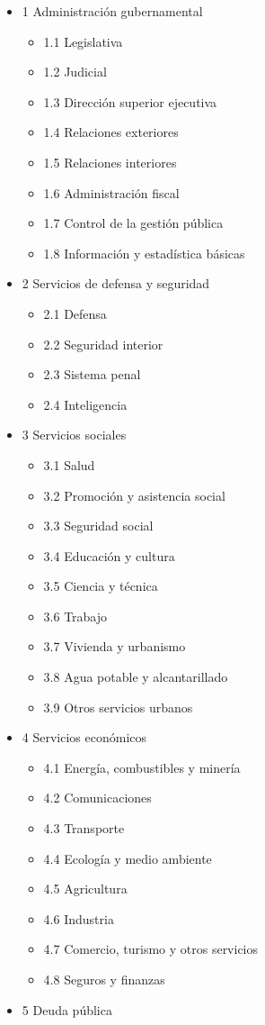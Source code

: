\documentclass[
  12,
]{article}
\providecommand{\tightlist}{%
  \setlength{\itemsep}{0pt}\setlength{\parskip}{0pt}}
\begin{document}
\begin{itemize}
\tightlist
\item
  1 Administración gubernamental

  \begin{itemize}
  \tightlist
  \item
    1.1 Legislativa
  \item
    1.2 Judicial
  \item
    1.3 Dirección superior ejecutiva
  \item
    1.4 Relaciones exteriores
  \item
    1.5 Relaciones interiores
  \item
    1.6 Administración fiscal
  \item
    1.7 Control de la gestión pública
  \item
    1.8 Información y estadística básicas
  \end{itemize}
\item
  2 Servicios de defensa y seguridad

  \begin{itemize}
  \tightlist
  \item
    2.1 Defensa
  \item
    2.2 Seguridad interior
  \item
    2.3 Sistema penal
  \item
    2.4 Inteligencia
  \end{itemize}
\item
  3 Servicios sociales

  \begin{itemize}
  \tightlist
  \item
    3.1 Salud
  \item
    3.2 Promoción y asistencia social
  \item
    3.3 Seguridad social
  \item
    3.4 Educación y cultura
  \item
    3.5 Ciencia y técnica
  \item
    3.6 Trabajo
  \item
    3.7 Vivienda y urbanismo
  \item
    3.8 Agua potable y alcantarillado
  \item
    3.9 Otros servicios urbanos
  \end{itemize}
\item
  4 Servicios económicos

  \begin{itemize}
  \tightlist
  \item
    4.1 Energía, combustibles y minería
  \item
    4.2 Comunicaciones
  \item
    4.3 Transporte
  \item
    4.4 Ecología y medio ambiente
  \item
    4.5 Agricultura
  \item
    4.6 Industria
  \item
    4.7 Comercio, turismo y otros servicios
  \item
    4.8 Seguros y finanzas
  \end{itemize}
\item
  5 Deuda pública


\end{itemize}
\end{document}
